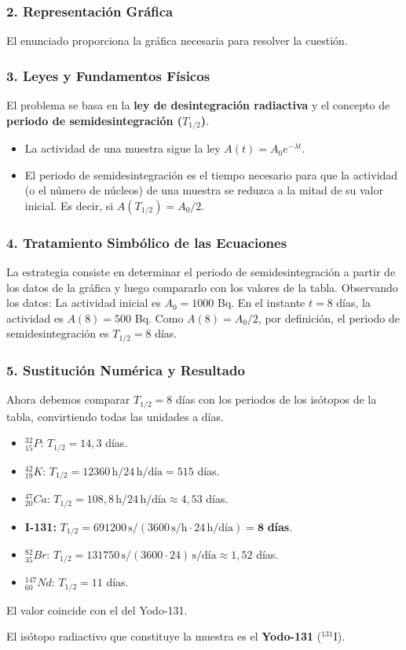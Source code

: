 \subsubsection*{2. Representación Gráfica}
El enunciado proporciona la gráfica necesaria para resolver la cuestión.

\subsubsection*{3. Leyes y Fundamentos Físicos}
El problema se basa en la \textbf{ley de desintegración radiactiva} y el concepto de \textbf{periodo de semidesintegración ($T_{1/2}$)}.
\begin{itemize}
    \item La actividad de una muestra sigue la ley $A(t) = A_0 e^{-\lambda t}$.
    \item El periodo de semidesintegración es el tiempo necesario para que la actividad (o el número de núcleos) de una muestra se reduzca a la mitad de su valor inicial. Es decir, si $A(T_{1/2}) = A_0/2$.
\end{itemize}

\subsubsection*{4. Tratamiento Simbólico de las Ecuaciones}
La estrategia consiste en determinar el periodo de semidesintegración a partir de los datos de la gráfica y luego compararlo con los valores de la tabla.
Observando los datos:
La actividad inicial es $A_0 = 1000$ Bq.
En el instante $t = 8$ días, la actividad es $A(8) = 500$ Bq.
Como $A(8) = A_0/2$, por definición, el periodo de semidesintegración es $T_{1/2} = 8$ días.

\subsubsection*{5. Sustitución Numérica y Resultado}
Ahora debemos comparar $T_{1/2} = 8$ días con los periodos de los isótopos de la tabla, convirtiendo todas las unidades a días.
\begin{itemize}
    \item ${}_{15}^{32}P$: $T_{1/2} = 14,3$ días.
    \item ${}_{19}^{42}K$: $T_{1/2} = 12360\,\text{h} / 24\,\text{h/día} = 515$ días.
    \item ${}_{20}^{47}Ca$: $T_{1/2} = 108,8\,\text{h} / 24\,\text{h/día} \approx 4,53$ días.
    \item \textbf{I-131:} $T_{1/2} = 691200\,\text{s} / (3600\,\text{s/h} \cdot 24\,\text{h/día}) = \boldsymbol{8}$ \textbf{días}.
    \item ${}_{35}^{82}Br$: $T_{1/2} = 131750\,\text{s} / (3600 \cdot 24)\,\text{s/día} \approx 1,52$ días.
    \item ${}_{60}^{147}Nd$: $T_{1/2} = 11$ días.
\end{itemize}
El valor coincide con el del Yodo-131.
\begin{cajaresultado}
El isótopo radiactivo que constituye la muestra es el \textbf{Yodo-131} (${}^{131}\text{I}$).
\end{cajaresultado}

